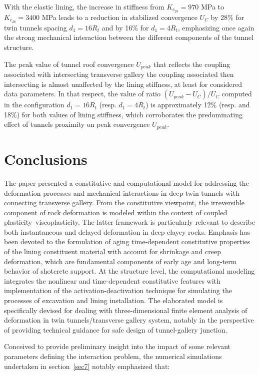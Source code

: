 \documentclass[a4paper,fleqn]{cas-sc}
\begin{document}
With the elastic lining, the increase in stiffness from $K_{c_{28}}=970$ MPa to $K_{c_{28}}=3400$ MPa leads to a reduction in stabilized convergence $U_C$ by 28\% for twin tunnels spacing  $d_1=16R_t$ and by 16\% for $d_1=4R_t$, emphasizing once again the strong mechanical interaction between the different components of the tunnel structure.

The peak value of tunnel roof convergence $U_{peak}$ that reflects the coupling associated with intersecting transverse gallery the coupling associated then intersecting is almost unaffected by the lining stiffness, at least for considered data parameters. In that respect, the value of ratio $(U_{peak}-U_C)/U_C$ computed in the configuration $d_1=16R_t$ (resp. $d_1=4R_t$) is  approximately 12\% (resp. and 18\%) for both values of lining stiffness, which corroborates the predominating effect of tunnels proximity on peak convergence $U_{peak}$. 

\section{Conclusions}\label{}

The paper presented a constitutive and computational model for addressing the deformation processes and mechanical interactions in deep twin tunnels with connecting transverse gallery. From the constitutive viewpoint, the irreversible component of rock deformation is modeled within the context of coupled plasticity–viscoplasticity. The latter framework is particularly relevant to describe both instantaneous and delayed deformation in deep clayey rocks. Emphasis has been devoted to the formulation of aging time-dependent constitutive properties of the lining constituent material with account for shrinkage and creep deformation, which are fundamental components of early age and long-term behavior of shotcrete support. At the structure level, the computational modeling integrates the nonlinear and time-dependent constitutive features with implementation of the activation-deactivation technique for simulating the processes of excavation and lining installation. The elaborated model is specifically devised for dealing with three-dimensional finite element analysis of deformation in twin tunnels/transverse gallery system, notably in the perspective of providing technical guidance for safe design of tunnel-gallery junction.

Conceived to provide preliminary insight into the impact of some relevant parameters defining the interaction problem, the numerical simulations undertaken in section~\ref{sec7} notably emphasized that:
\end{document}
